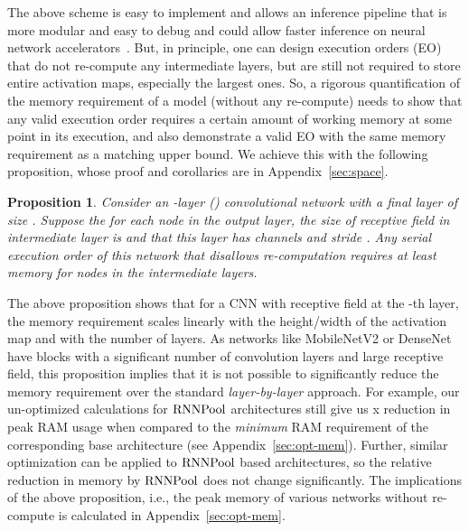 \documentclass[10pt]{article}
\newcommand{\rpool}{\ensuremath{{\rm RNNPool}}\xspace}
\newtheorem{proposition}{Proposition}
\begin{document}
The above scheme is easy to implement and allows an inference pipeline
that is more modular and easy to debug and could allow faster
inference on neural network accelerators~\citep{tpu}. But, in
principle, one can design execution orders (EO) that do not re-compute
any intermediate layers, but are still not required to store entire
activation maps, especially the largest ones. So, a rigorous
quantification of the memory requirement of a model (without any
re-compute) needs to show that any valid execution order requires a
certain amount of working memory at some point in its execution, and
also demonstrate a valid EO with the same memory requirement as a
matching upper bound. We achieve this with the following proposition,
whose proof and corollaries are in Appendix~\ref{sec:space}.
\vspace{-1mm}
\begin{proposition}
	\label{prop:mem}
	Consider an -layer () convolutional network with a
        final layer of size .  Suppose the for each node in
        the output layer, the size of receptive field in intermediate
        layer  is  and that
        this layer has  channels and stride .  Any serial
        execution order of this network that disallows re-computation
        requires at least  memory for nodes in the intermediate layers.
\end{proposition}
\vspace{-1mm}
The above proposition shows that for a CNN with receptive field 
at the -th layer, the memory requirement scales linearly with the
height/width of the activation map and with the number of layers. As
networks like MobileNetV2 or DenseNet have blocks with a significant
number of convolution layers and large receptive field, this
proposition implies that it is not possible to significantly reduce
the memory requirement over the standard {\em layer-by-layer}
approach. For example, our un-optimized calculations for \rpool
architectures still give us x reduction in peak RAM usage when
compared to the {\em minimum} RAM requirement of the corresponding
base architecture (see Appendix~\ref{sec:opt-mem}). Further, similar
optimization can be applied to \rpool based architectures, so the relative reduction in memory by \rpool does not change
significantly. The implications of the above proposition, i.e., the
peak memory of various networks without re-compute is calculated in
Appendix~\ref{sec:opt-mem}.
\end{document}
